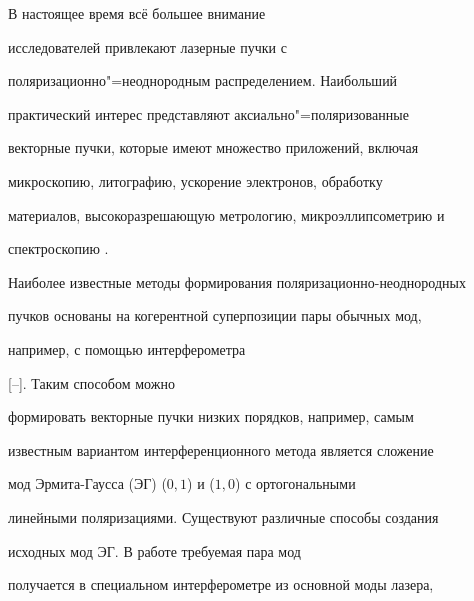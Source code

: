 


\date{12/V/2012}




\maketitle



\smallskip



 В настоящее время всё большее внимание

исследователей привлекают лазерные пучки с

поляризационно"=неоднородным распределением. Наибольший

практический интерес представляют аксиально"=поляризованные

векторные пучки, которые имеют множество приложений, включая

микроскопию, литографию, ускорение электронов, обработку

материалов, высокоразрешающую метрологию, микроэллипсометрию и

спектроскопию \cite{karpeev:bib1}.



Наиболее известные методы формирования поляризационно-неоднородных

пучков основаны на когерентной суперпозиции пары обычных мод,

например, с помощью интерферометра

[--]. Таким способом можно

формировать векторные пучки низких порядков, например, самым

известным вариантом интерференционного метода является сложение

мод Эрмита-Гаусса (ЭГ) ($0,1$) и ($1,0$) с ортогональными

линейными поляризациями. Существуют различные способы создания

исходных мод ЭГ. В работе \cite{karpeev:bib4} требуемая пара мод

получается в специальном интерферометре из основной моды лазера,

